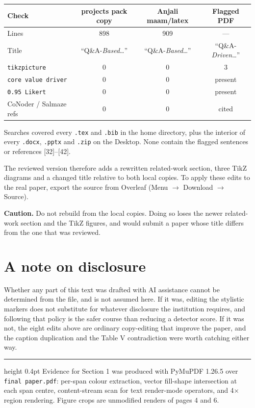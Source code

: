 \documentclass[11pt,a4paper]{article}
\begin{document}
\begin{center}
\begin{tabular}{@{}lccc@{}}
\toprule
\textbf{Check} & \textbf{projects pack copy} & \textbf{Anjali maam/latex} & \textbf{Flagged PDF} \\
\midrule
Lines                      & 898 & 909 & --- \\
Title                      & ``Q\&A-\emph{Based}\ldots'' & ``Q\&A-\emph{Based}\ldots'' & ``Q\&A-\emph{Driven}\ldots'' \\
\texttt{tikzpicture}       & 0 & 0 & 3 \\
\texttt{core value driver} & 0 & 0 & present \\
\texttt{0.95 Likert}       & 0 & 0 & present \\
CoNoder / Salmaze refs     & 0 & 0 & cited \\
\bottomrule
\end{tabular}
\end{center}

\noindent
Searches covered every \texttt{.tex} and \texttt{.bib} in the home directory,
plus the interior of every \texttt{.docx}, \texttt{.pptx} and \texttt{.zip} on
the Desktop. None contain the flagged sentences or references [32]--[42].

The reviewed version therefore adds a rewritten related-work section, three
TikZ diagrams and a changed title relative to both local copies. To apply these
edits to the real paper, export the source from Overleaf
(Menu $\rightarrow$ Download $\rightarrow$ Source).

\vspace{6pt}
\noindent
\textbf{Caution.} Do not rebuild from the local copies. Doing so loses the newer
related-work section and the TikZ figures, and would submit a paper whose title
differs from the one that was reviewed.

\section{A note on disclosure}

Whether any part of this text was drafted with AI assistance cannot be
determined from the file, and is not assumed here. If it was, editing the
stylistic markers does not substitute for whatever disclosure the institution
requires, and following that policy is the safer course than reducing a detector
score. If it was not, the eight edits above are ordinary copy-editing that
improve the paper, and the caption duplication and the Table V contradiction
were worth catching either way.

\vfill
\hrule height 0.4pt
\vspace{4pt}
{\footnotesize Evidence for Section 1 was produced with PyMuPDF 1.26.5 over
\texttt{final paper.pdf}: per-span colour extraction, vector fill-shape
intersection at each span centre, content-stream scan for text render-mode
operators, and 4$\times$ region rendering. Figure crops are unmodified renders
of pages 4 and 6.}
\end{document}

